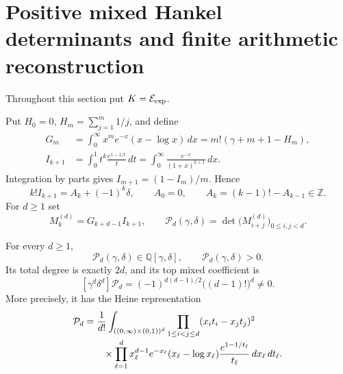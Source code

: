 \section{Positive mixed Hankel determinants and finite arithmetic reconstruction}
\label{sec:positive-mixed-hankel}

Throughout this section put $K=\mathcal E_{\mathrm{exp}}$.

Put $H_0=0$, $H_m=\sum_{j=1}^m1/j$, and define
\begin{align}
 G_m
 &=\int_0^\infty x^me^{-x}(x-\log x)\,dx
   =m!(\gamma+m+1-H_m),
 \label{eq:mixed-G-moment}\\
 I_{k+1}
 &=\int_0^1t^k\frac{e^{1-1/t}}t\,dt
   =\int_0^\infty\frac{e^{-x}}{(1+x)^{k+1}}\,dx.
 \label{eq:mixed-I-moment}
\end{align}
Integration by parts gives $I_{m+1}=(1-I_m)/m$.  Hence
\begin{equation}\label{eq:mixed-I-arithmetic}
 k!I_{k+1}=A_k+(-1)^k\delta,
 \qquad A_0=0,
 \qquad A_k=(k-1)!-A_{k-1}\in\mathbb Z.
\end{equation}
For $d\geq1$ set
\begin{equation}\label{eq:mixed-Hankel-definition}
 M_k^{(d)}=G_{k+d-1}I_{k+1},
 \qquad
 \mathcal P_d(\gamma,\delta)
 =\det\bigl(M_{i+j}^{(d)}\bigr)_{0\leq i,j<d}.
\end{equation}

\begin{theorem}
\label{thm:positive-full-degree-mixed-determinant}
For every $d\geq1$,
\[
 \mathcal P_d(\gamma,\delta)\in\mathbb Q[\gamma,\delta],
 \qquad \mathcal P_d(\gamma,\delta)>0.
\]
Its total degree is exactly $2d$, and its top mixed coefficient is
\begin{equation}\label{eq:mixed-Hankel-top-coefficient}
 [\gamma^d\delta^d]\mathcal P_d
 =(-1)^{d(d-1)/2}\bigl((d-1)!\bigr)^d\ne0.
\end{equation}
More precisely, it has the Heine representation
\begin{align}
 \mathcal P_d
 &=\frac1{d!}
 \int_{((0,\infty)\times(0,1))^d}
 \prod_{1\leq i<j\leq d}(x_it_i-x_jt_j)^2
 \notag\\[-1mm]
 &\qquad\times
 \prod_{\ell=1}^d
 x_\ell^{d-1}e^{-x_\ell}(x_\ell-\log x_\ell)
 \frac{e^{1-1/t_\ell}}{t_\ell}
 \,dx_\ell\,dt_\ell.
 \label{eq:mixed-Hankel-Heine}
\end{align}
\end{theorem}


